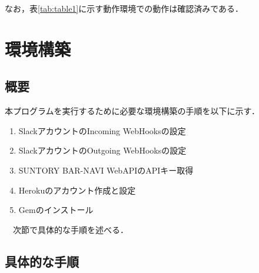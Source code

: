 \documentclass[fleqn, 14pt]{extarticlej}
\begin{document}
\begin{table}[bt]
  \begin{center}
    \caption{動作環境}
    \label{tab:table1}
    \vspace{0.3cm}
  \end{center}
\end{table}

なお，表\ref{tab:table1}に示す動作環境での動作は確認済みである．
\section{環境構築}
\label{環境構築}
\subsection{概要}
本プログラムを実行するために必要な環境構築の手順を以下に示す．
\begin{enumerate}
\item SlackアカウントのIncoming WebHooksの設定
\item SlackアカウントのOutgoing WebHooksの設定
\item SUNTORY BAR-NAVI WebAPIのAPIキー取得\cite{Suntory}
\item Herokuのアカウント作成と設定
\item Gemのインストール
\end{enumerate}
　次節で具体的な手順を述べる．
\subsection{具体的な手順}
\end{document}
